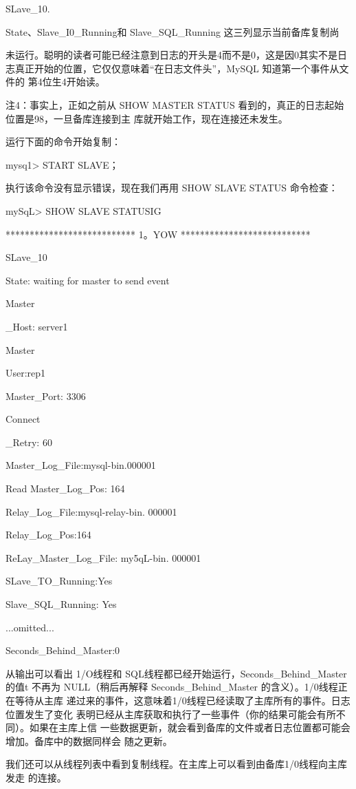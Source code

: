 SLave\_10.

State、Slave\_I0\_Running和 Slave\_SQL\_Running 这三列显示当前备库复制尚

未运行。聪明的读者可能已经注意到日志的开头是4而不是0，这是因0其实不是日
志真正开始的位置，它仅仅意味着“在日志文件头”，MySQL 知道第一个事件从文件的
第4位生4开始读。

注4：事实上，正如之前从 SHOW MASTER STATUS 看到的，真正的日志起始位置是98，一旦备库连接到主
库就开始工作，现在连接还未发生。

运行下面的命令开始复制：

mysq1> START SLAVE；

执行该命令没有显示错误，现在我们再用 SHOW SLAVE STATUS 命令检查：

mySqL> SHOW SLAVE STATUSIG

*************************** 1。YOW ***************************

SLave\_10

State: waiting for master to send event

Master

\_Host: server1

Master

User:rep1

Master\_Port: 3306

Connect

\_Retry: 60

Master\_Log\_File:mysql-bin.000001

Read Master\_Log\_Pos: 164

Relay\_Log\_File:mysql-relay-bin. 000001

Relay\_Log\_Pos:164

ReLay\_Master\_Log\_File: my5qL-bin. 000001

SLave\_TO\_Running:Yes

Slave\_SQL\_Running: Yes

...omitted...

Seconds\_Behind\_Master:0

从输出可以看出 1/O线程和 SQL线程都已经开始运行，Seconds\_Behind\_Master 的值t
不再为 NULL（稍后再解释 Seconds\_Behind\_Master 的含义）。1/0线程正在等待从主库
递过来的事件，这意味着1/0线程已经读取了主库所有的事件。日志位置发生了变化
表明已经从主库获取和执行了一些事件（你的结果可能会有所不同）。如果在主库上信
一些数据更新，就会看到备库的文件或者日志位置都可能会增加。备库中的数据同样会
随之更新。

我们还可以从线程列表中看到复制线程。在主库上可以看到由备库1/0线程向主库发走
的连接。

